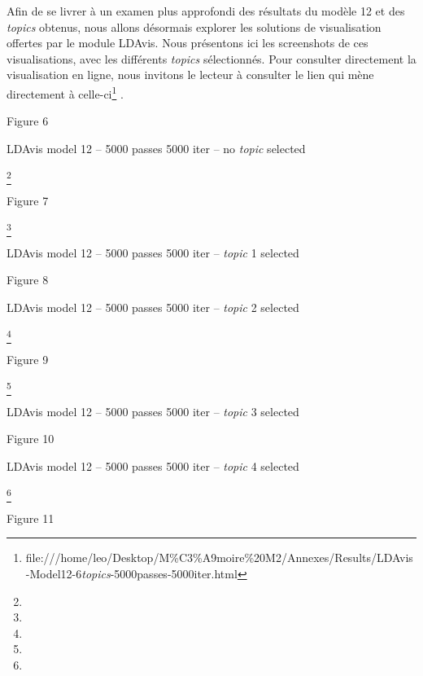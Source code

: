 \documentclass[letterpaper,portrait,12pt]{article}
\begin{document}
	Afin de se livrer \`{a} un examen plus approfondi des r\'{e}sultats du mod\`{e}le 12 et des \emph{topics} obtenus, nous allons d\'{e}sormais explorer les solutions de visualisation offertes par le module LDAvis. Nous pr\'{e}sentons ici les screenshots de ces visualisations, avec les diff\'{e}rents \emph{topics} s\'{e}lectionn\'{e}s. Pour consulter directement la visualisation en ligne, nous invitons le lecteur \`{a} consulter le lien qui m\`{e}ne directement \`{a} celle-ci\footnote{	file:///home/leo/Desktop/M\%C3\%A9moire\%20M2/Annexes/Results/LDAvis-Model12-6\emph{topics}-5000passes-5000iter.html} .




















Figure 6 





LDAvis model 12 -- 5000 passes 5000 iter -- no \emph{topic} selected


\footnote{} 


Figure 7





\footnote{} 


LDAvis model 12 -- 5000 passes 5000 iter -- \emph{topic} 1 selected


Figure 8





LDAvis model 12 -- 5000 passes 5000 iter -- \emph{topic} 2 selected


\footnote{} 


Figure 9





\footnote{} 


LDAvis model 12 -- 5000 passes 5000 iter -- \emph{topic} 3 selected


Figure 10





LDAvis model 12 -- 5000 passes 5000 iter -- \emph{topic} 4 selected


\footnote{} 


Figure 11
\end{document}
